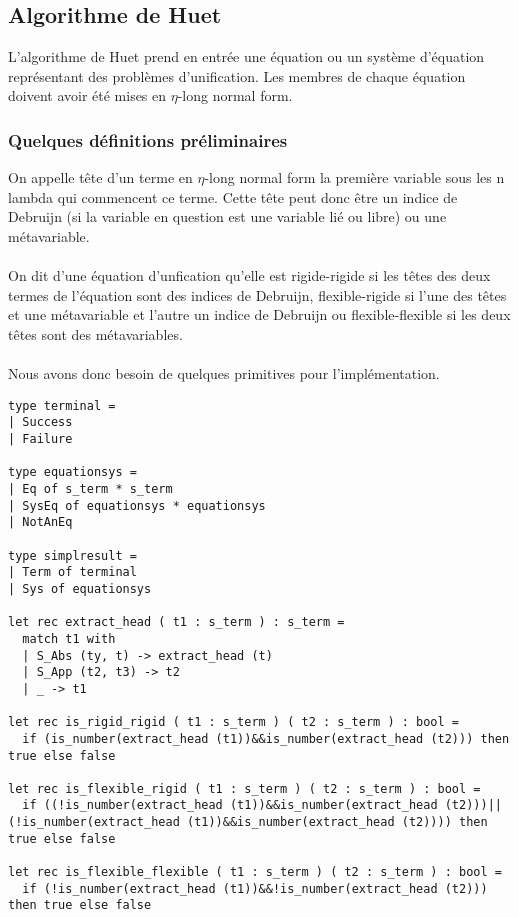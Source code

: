 \subsection{Algorithme de Huet}

L'algorithme de Huet prend en entrée une équation ou un système d'équation représentant des problèmes d'unification. Les membres de chaque équation doivent avoir été mises en $\eta$-long normal form. 

\subsubsection{Quelques définitions préliminaires}
On appelle tête d'un terme en $\eta$-long normal form la première variable sous les n lambda qui commencent ce terme. Cette tête peut donc être un indice de Debruijn (si la variable en question est une variable lié ou libre) ou une métavariable.
\paragraph{}
On dit d'une équation d'unfication qu'elle est rigide-rigide si les têtes des deux termes de l'équation sont des indices de Debruijn, flexible-rigide si l'une des têtes et une métavariable et l'autre un indice de Debruijn ou flexible-flexible si les deux têtes sont des métavariables.
\paragraph{}

Nous avons donc besoin de quelques primitives pour l'implémentation.
\begin{lstlisting}
type terminal =
| Success
| Failure

type equationsys =
| Eq of s_term * s_term
| SysEq of equationsys * equationsys
| NotAnEq

type simplresult = 
| Term of terminal
| Sys of equationsys

let rec extract_head ( t1 : s_term ) : s_term =
  match t1 with
  | S_Abs (ty, t) -> extract_head (t)
  | S_App (t2, t3) -> t2
  | _ -> t1

let rec is_rigid_rigid ( t1 : s_term ) ( t2 : s_term ) : bool =
  if (is_number(extract_head (t1))&&is_number(extract_head (t2))) then true else false

let rec is_flexible_rigid ( t1 : s_term ) ( t2 : s_term ) : bool =
  if ((!is_number(extract_head (t1))&&is_number(extract_head (t2)))||(!is_number(extract_head (t1))&&is_number(extract_head (t2)))) then true else false

let rec is_flexible_flexible ( t1 : s_term ) ( t2 : s_term ) : bool =
  if (!is_number(extract_head (t1))&&!is_number(extract_head (t2))) then true else false
\end{lstlisting}

